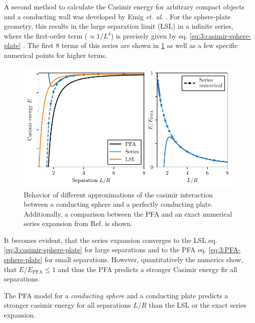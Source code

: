 A second method to calculate the Casimir energy for arbitrary compact objects and a conducting wall was developed by Emig \textit{et. al.} \cite{Emig_2007}. For the sphere-plate geometry, this results in the large separation limit (LSL) in a infinite series, where the first-order term ($\propto 1/L^4$) is precisely given by eq. \eqref{eq:3:casimir-sphere-plate} \cite{Emig_2007a,Pirozhenko_2013}. The first 8 terms of this series are shown in \cref{fig:3:casimir-behavior} as well as a few specific numerical points for higher terms.
\begin{figure}[!ht]
  \centering
  \includegraphics[width=\textwidth]{./../figures/casimir-behavior.pdf}
  \caption{Behavior of different approximations of the casimir interaction between a conducting sphere and a perfectly conducting plate. Additionally, a comparison between the PFA and an exact numerical series expansion from Ref. \cite{Emig_2007a} is shown.}
  \label{fig:3:casimir-behavior}
\end{figure}
It becomes evident, that the series expansion converges to the LSL eq. \eqref{eq:3:casimir-sphere-plate} for large separations and to the PFA eq. \eqref{eq:3:PFA-sphere-plate} for small separations.
However, quantitatively the numerics show, that $E/E_\mathrm{PFA} \leq 1$ and thus the PFA predicts a stronger Casimir energy fir all separations.
\begin{theorem}
  The PFA model for a \emph{conducting sphere} and a conducting plate predicts a stronger casimir energy for all separations $L/R$ than the LSL or the exact series expansion.
\end{theorem}
